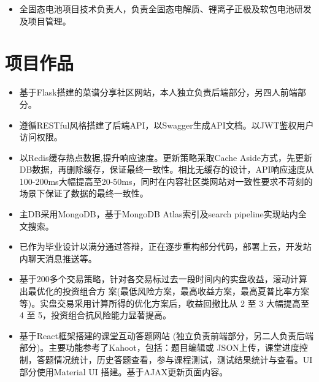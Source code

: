 \documentclass{resume}
\begin{document}
\begin{itemize}
  \item 全固态电池项目技术负责人，负责全固态电解质、锂离子正极及软包电池研发及项目管理。
\end{itemize}


\section{项目作品}

\begin{itemize}
  \item 基于Flask搭建的菜谱分享社区网站，本人独立负责后端部分，另四人前端部分。
  \item 遵循RESTful风格搭建了后端API，以Swagger生成API文档。以JWT鉴权用户访问权限。
  \item 以Redis缓存热点数据,提升响应速度。更新策略采取Cache Aside方式，先更新DB数据，再删除缓存，保证最终一致性。相比无缓存的设计，API响应速度从100-200ms大幅提高至20-50ms，同时在内容社区类网站对一致性要求不苛刻的场景下保证了数据的最终一致性。
  \item 主DB采用MongoDB，基于MongoDB Atlas索引及search pipeline实现站内全文搜索。
  \item 已作为毕业设计以满分通过答辩，正在逐步重构部分代码，部署上云，开发站内聊天消息推送等。
\end{itemize}

\begin{itemize}
  \item 基于200多个交易策略，针对各交易标过去一段时间内的实盘收益，滚动计算出最优化的投资组合方
  案(最低风险方案，最高收益方案，最高夏普比率方案等)。实盘交易采用计算所得的优化方案后，收益回撤比从 2 至 3 
  大幅提高至 4 至 5，投资组合抗风险能力显著提高。
\end{itemize}


\begin{itemize}
  \item 基于React框架搭建的课堂互动答题网站 (独立负责前端部分，另二人负责后端部分)。主要功能参考了Kahoot，包括：题目编辑或
  JSON上传，课堂进度控制，答题情况统计，历史答题查看，参与课程测试，测试结果统计与查看。UI 部分使用Material UI 搭建。基于AJAX更新页面内容。
\end{itemize}
\end{document}
